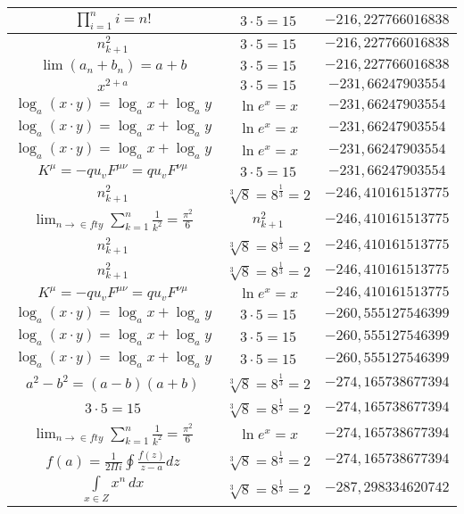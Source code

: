 \documentclass{article}
\begin{document}
\begin{flushleft}
\begin{longtable}{|c|c|c|}
$\prod_{i=1}^ni=n!$ & $3\cdot 5=15$ & $-216,227766016838$ \\ \hline 
$n_{k+1}^2$ & $3\cdot 5=15$ & $-216,227766016838$ \\ \hline 
$\lim\left(a_n+b_n\right)=a+b$ & $3\cdot 5=15$ & $-216,227766016838$ \\ \hline 
$x^{2+a}$ & $3\cdot 5=15$ & $-231,66247903554$ \\ \hline 
$\log_{a}(x\cdot y)=\log_{a}x+\log_{a}y$ & $\ln e^x=x$ & $-231,66247903554$ \\ \hline 
$\log_{a}(x\cdot y)=\log_{a}x+\log_{a}y$ & $\ln e^x=x$ & $-231,66247903554$ \\ \hline 
$\log_{a}(x\cdot y)=\log_{a}x+\log_{a}y$ & $\ln e^x=x$ & $-231,66247903554$ \\ \hline 
$K^\mu=-qu_vF^{\mu\nu}=qu_vF^{\nu\mu}$ & $3\cdot 5=15$ & $-231,66247903554$ \\ \hline 
$n_{k+1}^2$ & $\sqrt[3]{8}=8^{\frac{1}{3}}=2$ & $-246,410161513775$ \\ \hline 
$\lim_{n\to\in fty}\sum_{k=1}^n\frac{1}{k^2}=\frac{\pi^2}{6}$ & $n_{k+1}^2$ & $-246,410161513775$ \\ \hline 
$n_{k+1}^2$ & $\sqrt[3]{8}=8^{\frac{1}{3}}=2$ & $-246,410161513775$ \\ \hline 
$n_{k+1}^2$ & $\sqrt[3]{8}=8^{\frac{1}{3}}=2$ & $-246,410161513775$ \\ \hline 
$K^\mu=-qu_vF^{\mu\nu}=qu_vF^{\nu\mu}$ & $\ln e^x=x$ & $-246,410161513775$ \\ \hline 
$\log_{a}(x\cdot y)=\log_{a}x+\log_{a}y$ & $3\cdot 5=15$ & $-260,555127546399$ \\ \hline 
$\log_{a}(x\cdot y)=\log_{a}x+\log_{a}y$ & $3\cdot 5=15$ & $-260,555127546399$ \\ \hline 
$\log_{a}(x\cdot y)=\log_{a}x+\log_{a}y$ & $3\cdot 5=15$ & $-260,555127546399$ \\ \hline 
$a^2-b^2=(a-b)(a+b)$ & $\sqrt[3]{8}=8^{\frac{1}{3}}=2$ & $-274,165738677394$ \\ \hline 
$3\cdot 5=15$ & $\sqrt[3]{8}=8^{\frac{1}{3}}=2$ & $-274,165738677394$ \\ \hline 
$\lim_{n\to\in fty}\sum_{k=1}^n\frac{1}{k^2}=\frac{\pi^2}{6}$ & $\ln e^x=x$ & $-274,165738677394$ \\ \hline 
$f\left(a\right)=\frac{1}{2\Pi i}\oint\frac{f\left(z\right)}{z-a}dz$ & $\sqrt[3]{8}=8^{\frac{1}{3}}=2$ & $-274,165738677394$ \\ \hline 
$\int \limits_{x\in Z}\!x^{n}\,dx$ & $\sqrt[3]{8}=8^{\frac{1}{3}}=2$ & $-287,298334620742$ \\ \hline 

\end{longtable}
\end{flushleft}
\end{document}

